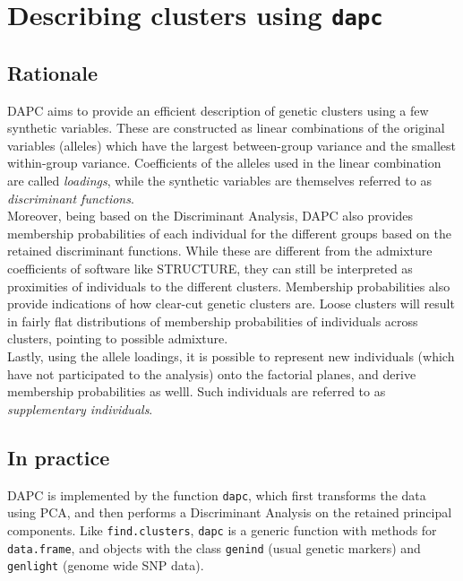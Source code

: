 \documentclass{article}
\newcommand{\code}[1]{{{\tt #1}}}
\begin{document}
\section{Describing clusters using \code{dapc}}


\subsection{Rationale}
DAPC aims to provide an efficient description of genetic clusters using a few synthetic variables.
These are constructed as linear combinations of the original variables (alleles) which have the
largest between-group variance and the smallest within-group variance. Coefficients of the alleles
used in the linear combination are called \textit{loadings}, while the synthetic variables are
themselves referred to as \textit{discriminant functions}.
\\

Moreover, being based on the Discriminant Analysis, DAPC also provides membership probabilities of
each individual for the different groups based on the retained discriminant functions. While these
are different from the admixture coefficients of software like STRUCTURE, they can still be
interpreted as proximities of individuals to the different clusters. Membership
probabilities also provide indications of how clear-cut genetic clusters are. Loose clusters will
result in fairly flat distributions of membership probabilities of individuals across clusters,
pointing to possible admixture.
\\

Lastly, using the allele loadings, it is possible to represent new individuals (which have not participated to the analysis)
onto the factorial planes, and derive membership probabilities as welll. Such individuals are
referred to as \textit{supplementary individuals}.



\subsection{In practice}

DAPC is implemented by the function \texttt{dapc}, which first transforms the data using PCA, and
then performs a Discriminant Analysis on the retained principal components. Like
\texttt{find.clusters}, \texttt{dapc} is a generic function with methods for \texttt{data.frame}, and objects with
the class \texttt{genind} (usual genetic markers) and \texttt{genlight} (genome wide SNP data).
\end{document}
